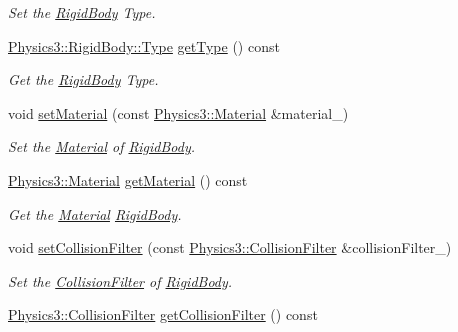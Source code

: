 \begin{DoxyCompactItemize}
\begin{DoxyCompactList}\small\item\em Set the \hyperlink{class_magnum_1_1_physics3_1_1_rigid_body}{Rigid\+Body} Type. \end{DoxyCompactList}\item 
\hyperlink{class_magnum_1_1_physics3_1_1_rigid_body_a429aa4fb7256b083334c86cdcd0d6b31}{Physics3\+::\+Rigid\+Body\+::\+Type} \hyperlink{class_magnum_1_1_physics3_1_1_rigid_body_afe815b07c2008f7a00931292de4f70d7}{get\+Type} () const 
\begin{DoxyCompactList}\small\item\em Get the \hyperlink{class_magnum_1_1_physics3_1_1_rigid_body}{Rigid\+Body} Type. \end{DoxyCompactList}\item 
void \hyperlink{class_magnum_1_1_physics3_1_1_rigid_body_af0647dd8feed5299adb2b478e60981b8}{set\+Material} (const \hyperlink{class_magnum_1_1_physics3_1_1_material}{Physics3\+::\+Material} \&material\+\_\+)
\begin{DoxyCompactList}\small\item\em Set the \hyperlink{class_magnum_1_1_physics3_1_1_material}{Material} of \hyperlink{class_magnum_1_1_physics3_1_1_rigid_body}{Rigid\+Body}. \end{DoxyCompactList}\item 
\hyperlink{class_magnum_1_1_physics3_1_1_material}{Physics3\+::\+Material} \hyperlink{class_magnum_1_1_physics3_1_1_rigid_body_a4d8892f1482f7443b6a0bf3cd2312e29}{get\+Material} () const 
\begin{DoxyCompactList}\small\item\em Get the \hyperlink{class_magnum_1_1_physics3_1_1_material}{Material} \hyperlink{class_magnum_1_1_physics3_1_1_rigid_body}{Rigid\+Body}. \end{DoxyCompactList}\item 
void \hyperlink{class_magnum_1_1_physics3_1_1_rigid_body_ac66ee7cb2b361a7100add5b262b1faa2}{set\+Collision\+Filter} (const \hyperlink{class_magnum_1_1_physics3_1_1_collision_filter}{Physics3\+::\+Collision\+Filter} \&collision\+Filter\+\_\+)
\begin{DoxyCompactList}\small\item\em Set the \hyperlink{class_magnum_1_1_physics3_1_1_collision_filter}{Collision\+Filter} of \hyperlink{class_magnum_1_1_physics3_1_1_rigid_body}{Rigid\+Body}. \end{DoxyCompactList}\item 
\hyperlink{class_magnum_1_1_physics3_1_1_collision_filter}{Physics3\+::\+Collision\+Filter} \hyperlink{class_magnum_1_1_physics3_1_1_rigid_body_a4432f9fb63b08c88832d57a70f9e2be8}{get\+Collision\+Filter} () const 

\end{DoxyCompactItemize}

